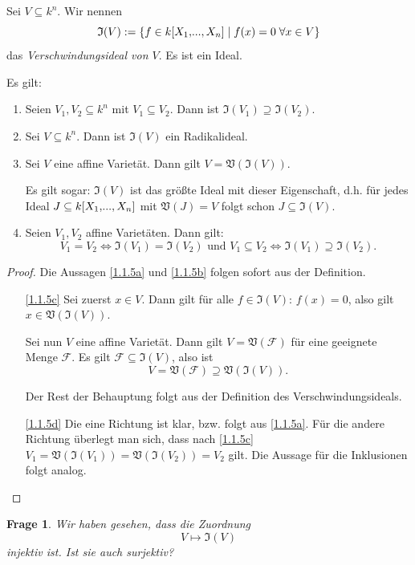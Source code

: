 \documentclass[a4paper,12pt,index=toc]{scrbook}
\theoremstyle{keinenummern} %
\newtheorem{q}{Frage}
\def\V{\mathfrak{V}}
\def\I{\mathfrak{I}}
\newcommand{\F}{\mathcal{F}}
\renewcommand{\dotsc}{\ensuremath{\!...}}
\newcommand{\polyx}[1][n]{\ensuremath%
  [X_{1},\dotsc,X_{#1}]}
\begin{document}
\begin{db}
Sei $V\subseteq k^{n}$. Wir nennen
\[\I(V):=\{f\in k\polyx\mid f(x)=0\;\forall x\in V\}\]
das \emph{Verschwindungsideal von $V$}. Es ist ein Ideal.
\end{db}

\begin{bem}\label{1.1.5} Es gilt:
\begin{enumerate}
\item{} Seien $V_{1},V_{2}\subseteq k^{n}$ mit $V_{1}\subseteq V_{2}$. Dann ist $\I(V_{1})\supseteq \I(V_{2})$.
\item{} Sei $V\subseteq k^{n}$. Dann ist $\I(V)$ ein Radikalideal.
\item{} Sei $V$ eine affine Varietät. Dann gilt $V=\V(\I(V))$.

Es gilt sogar: $\I(V)$ ist das größte Ideal mit dieser Eigenschaft, d.h. für jedes Ideal $J\subseteq k\polyx$ mit $\V(J)=V$ folgt schon $J\subseteq \I(V)$.
\item{} Seien $V_{1},V_{2}$ affine Varietäten. Dann gilt:
\[V_{1}=V_{2}\iff \I(V_{1})=\I(V_{2})\text{ und } V_{1}\subseteq V_{2}\iff \I(V_{1})\supseteq \I(V_{2}).\]
\end{enumerate}
\end{bem}

\begin{proof} Die Aussagen \ref{1.1.5a} und \ref{1.1.5b} folgen sofort aus der Definition.
\begin{enumerate}
\item[\ref{1.1.5c}] Sei zuerst $x\in V$. Dann gilt für alle $f\in \I(V)$: $f(x)=0$, also gilt $x\in \V(\I(V))$.

Sei nun $V$ eine affine Varietät. Dann gilt $V=\V(\F)$ für eine geeignete Menge $\F$. Es gilt $\F\subseteq \I(V)$, also ist
\[V=\V(\F)\supseteq \V(\I(V)).\]

Der Rest der Behauptung folgt aus der Definition des Verschwindungsideals.
\item[\ref{1.1.5d}] Die eine Richtung ist klar, bzw. folgt aus \ref{1.1.5a}. Für die andere Richtung überlegt man sich, dass nach \ref{1.1.5c} $V_{1}=\V(\I(V_{1}))=\V(\I(V_{2}))=V_{2}$ gilt.  Die Aussage für die Inklusionen folgt analog.
\end{enumerate}
\end{proof}

\begin{q}
Wir haben gesehen, dass die Zuordnung
\[V\mapsto \I(V)\]
injektiv ist. Ist sie auch surjektiv?
\end{q}
\end{document}
